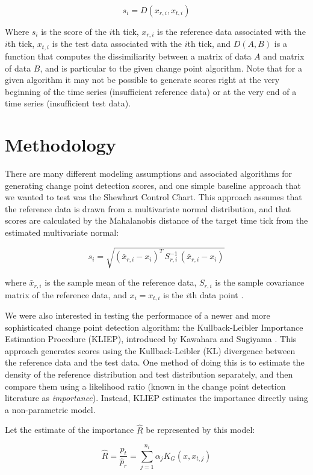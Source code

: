 \[
s_i = D(x_{r,i}, x_{t,i})
\]

Where $s_i$ is the score of the $i$th tick, $x_{r,i}$ is the reference
data associated with the $i$th tick, $x_{t,i}$ is the test data
associated with the $i$th tick, and $D(A,B)$ is a function that computes the
dissimiliarity between a matrix of data $A$ and matrix of data $B$, and is
particular to the given change point algorithm. Note that for a given
algorithm it may not be possible to generate scores right at the very beginning
of the time series (insufficient reference data) or at the very end of a time
series (insufficient test data).

\section{Methodology}

There are many different modeling assumptions and associated algorithms
for generating change point detection scores, and one simple baseline approach that we 
wanted to test was the Shewhart Control Chart. This approach assumes that the reference data is drawn from a
multivariate normal distribution, and that scores are calculated by the Mahalanobis
distance of the target time tick from the estimated multivariate normal:

\[
s_i = \sqrt{(\bar{x}_{r,i} - x_i)^T \, S_{r,i}^{-1} \, (\bar{x}_{r,i} - x_i)}
\]

where $\bar{x}_{r,i}$ is the sample mean of the reference data, $S_{r,i}$
is the sample covariance matrix of the reference data, and $x_i=x_{t,i}$ is
the $i$th data point \cite{shewhart26}.

We were also interested in testing the performance of a newer and more
sophisticated change point detection algorithm: the
Kullback-Leibler Importance Estimation Procedure (KLIEP),
introduced by Kawahara and Sugiyama \cite{sugiyama09} \cite{sugiyama08}.
This approach generates scores using the Kullback-Leibler (KL)
divergence between the reference data and the test data. One method of doing this
is to estimate the density of the reference distribution and test distribution
separately, and then compare them using a likelihood ratio
(known in the change point detection literature as \emph{importance}). 
Instead, KLIEP estimates the importance directly using a non-parametric model.

Let the estimate of the importance $\hat{R}$ be represented by this model:

\[
\hat{R} = \frac{p_{t}}{\hat{p}_{r}} = \sum_{j=1}^{n_{t}} \alpha_j K_G(x,x_{t,j})
\]

